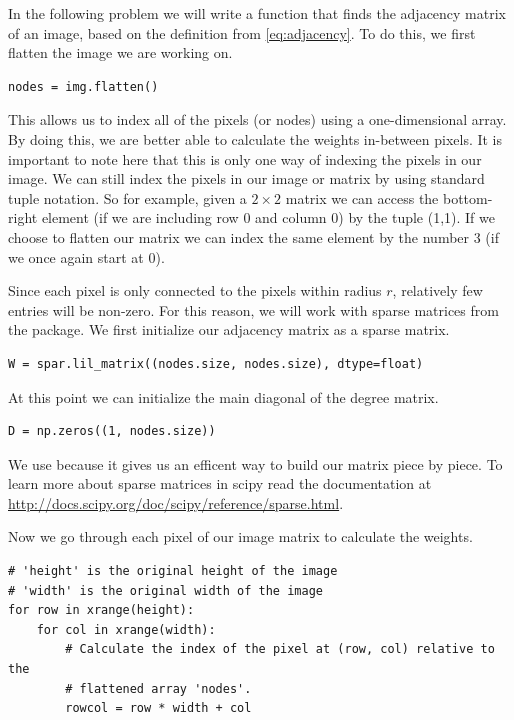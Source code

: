 In the following problem we will write a function that finds the adjacency matrix of an image, based on the definition from \eqref{eq:adjacency}. To do this, we first flatten the image we are working on. 

\begin{lstlisting}
nodes = img.flatten()
\end{lstlisting}

This allows us to index all of the pixels (or nodes) using a one-dimensional array. By doing this, we are better able to calculate the weights in-between pixels. It is important to note here that this is only one way of indexing the pixels in our image. We can still index the pixels in our image or matrix by using standard tuple notation. So for example, given a $2 \times 2$ matrix we can access the bottom-right element (if we are including row 0 and column 0) by the tuple (1,1). If we choose to flatten our matrix we can index the same element by the number 3 (if we once again start at 0).

Since each pixel is only connected to the pixels within radius $r$, relatively few entries will be non-zero. For this reason, we will work with sparse matrices from the  package. We first initialize our adjacency matrix as a sparse matrix.

\begin{lstlisting}
W = spar.lil_matrix((nodes.size, nodes.size), dtype=float)
\end{lstlisting}
At this point we can initialize the main diagonal of the degree matrix.
\begin{lstlisting}
D = np.zeros((1, nodes.size))
\end{lstlisting}


We use  because it gives us an efficent way to build our matrix piece by piece. To learn more about sparse matrices in scipy read the documentation at \url{http://docs.scipy.org/doc/scipy/reference/sparse.html}.

Now we go through each pixel of our image matrix to calculate the weights.

\begin{lstlisting}
# 'height' is the original height of the image
# 'width' is the original width of the image
for row in xrange(height):
    for col in xrange(width):
        # Calculate the index of the pixel at (row, col) relative to the
        # flattened array 'nodes'. 
        rowcol = row * width + col
\end{lstlisting}

